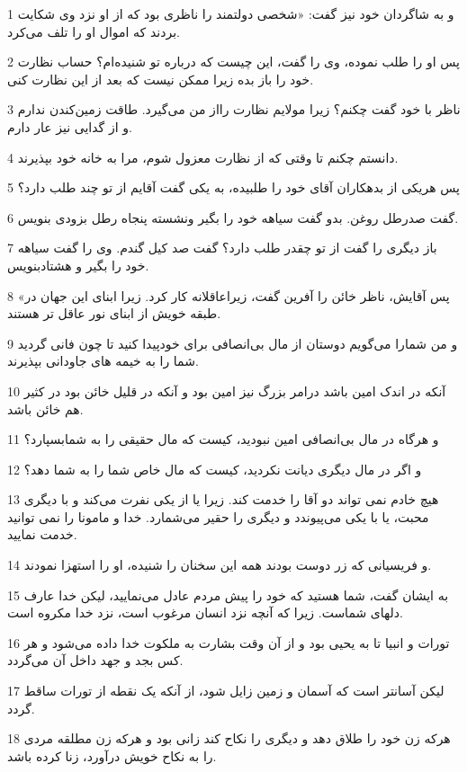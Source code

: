 \par 1 و به شاگردان خود نیز گفت: «شخصی دولتمند را ناظری بود که از او نزد وی شکایت بردند که اموال او را تلف می‌کرد.
\par 2 پس او را طلب نموده، وی را گفت، این چیست که درباره تو شنیده‌ام؟ حساب نظارت خود را باز بده زیرا ممکن نیست که بعد از این نظارت کنی.
\par 3 ناظر با خود گفت چکنم؟ زیرا مولایم نظارت رااز من می‌گیرد. طاقت زمین‌کندن ندارم و از گدایی نیز عار دارم.
\par 4 دانستم چکنم تا وقتی که از نظارت معزول شوم، مرا به خانه خود بپذیرند.
\par 5 پس هریکی از بدهکاران آقای خود را طلبیده، به یکی گفت آقایم از تو چند طلب دارد؟
\par 6 گفت صدرطل روغن. بدو گفت سیاهه خود را بگیر ونشسته پنجاه رطل بزودی بنویس.
\par 7 باز دیگری را گفت از تو چقدر طلب دارد؟ گفت صد کیل گندم. وی را گفت سیاهه خود را بگیر و هشتادبنویس.
\par 8 «پس آقایش، ناظر خائن را آفرین گفت، زیراعاقلانه کار کرد. زیرا ابنای این جهان در طبقه خویش از ابنای نور عاقل تر هستند.
\par 9 و من شمارا می‌گویم دوستان از مال بی‌انصافی برای خودپیدا کنید تا چون فانی گردید شما را به خیمه های جاودانی بپذیرند.
\par 10 آنکه در اندک امین باشد درامر بزرگ نیز امین بود و آنکه در قلیل خائن بود در کثیر هم خائن باشد.
\par 11 و هرگاه در مال بی‌انصافی امین نبودید، کیست که مال حقیقی را به شمابسپارد؟
\par 12 و اگر در مال دیگری دیانت نکردید، کیست که مال خاص شما را به شما دهد؟
\par 13 هیچ خادم نمی تواند دو آقا را خدمت کند. زیرا یا از یکی نفرت می‌کند و با دیگری محبت، یا با یکی می‌پیوندد و دیگری را حقیر می‌شمارد. خدا و مامونا را نمی توانید خدمت نمایید.
\par 14 و فریسیانی که زر دوست بودند همه این سخنان را شنیده، او را استهزا نمودند.
\par 15 به ایشان گفت، شما هستید که خود را پیش مردم عادل می‌نمایید، لیکن خدا عارف دلهای شماست. زیرا که آنچه نزد انسان مرغوب است، نزد خدا مکروه است.
\par 16 تورات و انبیا تا به یحیی بود و از آن وقت بشارت به ملکوت خدا داده می‌شود و هر کس بجد و جهد داخل آن می‌گردد.
\par 17 لیکن آسانتر است که آسمان و زمین زایل شود، از آنکه یک نقطه از تورات ساقط گردد.
\par 18 هر‌که زن خود را طلاق دهد و دیگری را نکاح کند زانی بود و هر‌که زن مطلقه مردی را به نکاح خویش درآورد، زنا کرده باشد.
